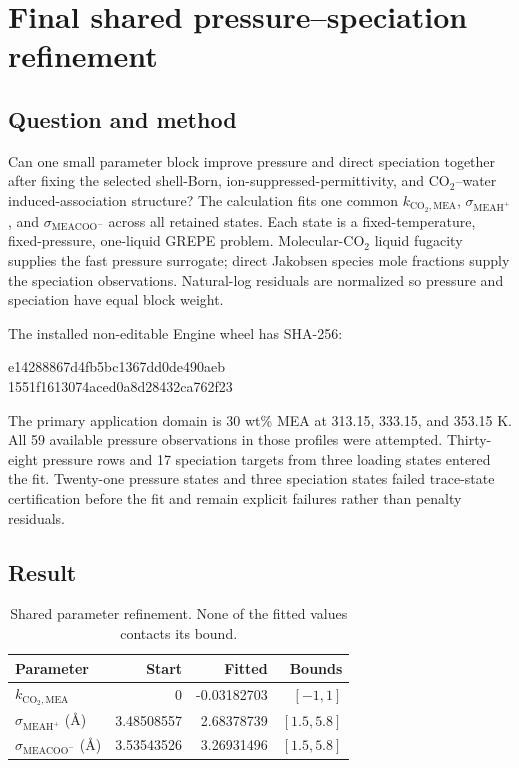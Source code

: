\section{Final shared pressure--speciation refinement}

\subsection{Question and method}

Can one small parameter block improve pressure and direct speciation together
after fixing the selected shell-Born, ion-suppressed-permittivity, and
CO$_2$--water induced-association structure? The calculation fits one common
$k_{\mathrm{CO_2,MEA}}$, $\sigma_{\mathrm{MEAH^+}}$, and
$\sigma_{\mathrm{MEACOO^-}}$ across all retained states. Each state is a
fixed-temperature, fixed-pressure, one-liquid GREPE problem. Molecular-CO$_2$
liquid fugacity supplies the fast pressure surrogate; direct Jakobsen species
mole fractions supply the speciation observations. Natural-log residuals are
normalized so pressure and speciation have equal block weight.

The installed non-editable Engine wheel has SHA-256:
\begin{center}
\small\ttfamily
e14288867d4fb5bc1367dd0de490aeb\allowbreak\\
1551f1613074aced0a8d28432ca762f23
\end{center}
The primary application domain is 30 wt\% MEA at 313.15, 333.15, and
353.15 K. All 59 available pressure observations in those profiles were
attempted. Thirty-eight pressure rows and 17 speciation targets from three
loading states entered the fit. Twenty-one pressure states and three
speciation states failed trace-state certification before the fit and remain
explicit failures rather than penalty residuals.

\subsection{Result}

\begin{table}[htbp]
\centering
\caption{Shared parameter refinement. None of the fitted values contacts its
bound.}
\begin{tabular}{lrrr}
\toprule
Parameter & Start & Fitted & Bounds \\
\midrule
$k_{\mathrm{CO_2,MEA}}$ & 0 & -0.03182703 & $[-1,1]$ \\
$\sigma_{\mathrm{MEAH^+}}$ (\si{\angstrom}) & 3.48508557 & 2.68378739 & $[1.5,5.8]$ \\
$\sigma_{\mathrm{MEACOO^-}}$ (\si{\angstrom}) & 3.53543526 & 3.26931496 & $[1.5,5.8]$ \\
\bottomrule
\end{tabular}
\end{table}

